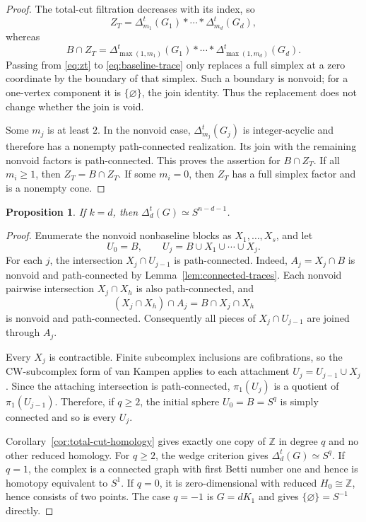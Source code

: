 \documentclass[11pt]{article}
\newtheorem{proposition}[theorem]{Proposition}
\theoremstyle{remark}
\numberwithin{equation}{section}
\begin{document}
\begin{proof}
The total-cut filtration decreases with its index, so
\begin{equation}
Z_T
=\Delta_{m_1}^t(G_1)*\cdots*\Delta_{m_d}^t(G_d),
\label{eq:zt}
\end{equation}
whereas
\begin{equation}
B\cap Z_T
=\Delta_{\max(1,m_1)}^t(G_1)*\cdots*
 \Delta_{\max(1,m_d)}^t(G_d).
\label{eq:baseline-trace}
\end{equation}
Passing from \eqref{eq:zt} to \eqref{eq:baseline-trace} only replaces a full
simplex at a zero coordinate by the boundary of that simplex. Such a boundary
is nonvoid; for a one-vertex component it is $\{\varnothing\}$, the join
identity. Thus the replacement does not change whether the join is void.

Some $m_j$ is at least $2$. In the nonvoid case,
$\Delta_{m_j}^t(G_j)$ is integer-acyclic and therefore has a nonempty
path-connected realization. Its join with the remaining nonvoid factors is
path-connected. This proves the assertion for $B\cap Z_T$. If all
$m_i\geq1$, then $Z_T=B\cap Z_T$. If some $m_i=0$, then $Z_T$ has a full
simplex factor and is a nonempty cone.
\end{proof}

\begin{proposition}\label{prop:k-equals-d}
If $k=d$, then $\Delta_d^t(G)\simeq S^{n-d-1}$.
\end{proposition}

\begin{proof}
Enumerate the nonvoid nonbaseline blocks as $X_1,\ldots,X_s$, and let
\begin{equation}
U_0=B,
\qquad
U_j=B\cup X_1\cup\cdots\cup X_j.
\label{eq:successive-unions}
\end{equation}
For each $j$, the intersection $X_j\cap U_{j-1}$ is path-connected. Indeed,
$A_j=X_j\cap B$ is nonvoid and path-connected by
Lemma~\ref{lem:connected-traces}. Each nonvoid pairwise intersection
$X_j\cap X_h$ is also path-connected, and
\[
(X_j\cap X_h)\cap A_j=B\cap X_j\cap X_h
\]
is nonvoid and path-connected. Consequently all pieces of
$X_j\cap U_{j-1}$ are joined through $A_j$.

Every $X_j$ is contractible. Finite subcomplex inclusions are cofibrations, so
the CW-subcomplex form of van Kampen applies to each attachment
$U_j=U_{j-1}\cup X_j$. Since the attaching intersection is path-connected,
$\pi_1(U_j)$ is a quotient of $\pi_1(U_{j-1})$. Therefore, if $q\geq2$, the
initial sphere $U_0=B=S^q$ is simply connected and so is every $U_j$.

Corollary~\ref{cor:total-cut-homology} gives exactly one copy of $\mathbb Z$ in
degree $q$ and no other reduced homology. For $q\geq2$, the wedge criterion
gives $\Delta_d^t(G)\simeq S^q$. If $q=1$, the complex is a connected graph
with first Betti number one and hence is homotopy equivalent to $S^1$. If
$q=0$, it is zero-dimensional with reduced $H_0\cong\mathbb Z$, hence consists
of two points. The case $q=-1$ is $G=dK_1$ and gives
$\{\varnothing\}=S^{-1}$ directly.
\end{proof}
\end{document}
